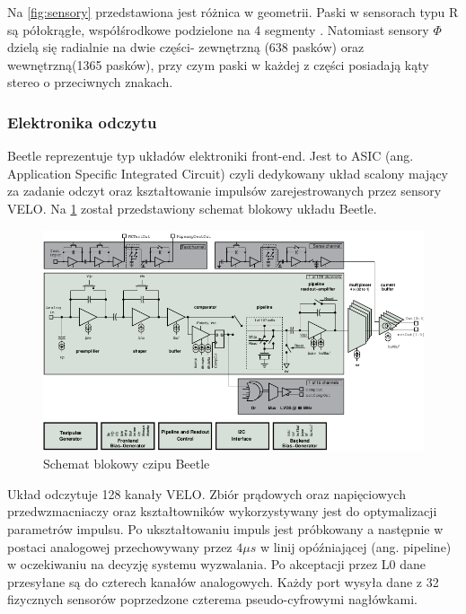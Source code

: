 Na \ref{fig:sensory} przedstawiona jest różnica w geometrii. Paski w sensorach typu R są półokrągłe, współśrodkowe podzielone na 4 segmenty . Natomiast sensory $\Phi$ dzielą się radialnie na dwie części- zewnętrzną (638 pasków) oraz wewnętrzną(1365 pasków), przy czym paski w każdej z części posiadają kąty stereo o przeciwnych znakach.
\subsubsection{Elektronika odczytu}
Beetle reprezentuje typ układów elektroniki front-end. Jest to ASIC (ang.  Application Specific Integrated Circuit) czyli dedykowany układ scalony mający za zadanie odczyt oraz kształtowanie impulsów zarejestrowanych przez sensory VELO.  Na \ref{fig:Beetle_Block} został przedstawiony schemat blokowy układu Beetle.
\begin{figure}[ht]
 \centering
 \includegraphics[scale=0.8]{rozdzial2/Beetle_block.jpeg}
 \caption{Schemat blokowy czipu Beetle\cite{Beetle}}
 \label{fig:Beetle_Block}
\end{figure}

Układ odczytuje 128 kanały VELO. Zbiór prądowych oraz napięciowych przedwzmacniaczy oraz kształtowników wykorzystywany jest do optymalizacji parametrów impulsu. 
Po ukształtowaniu impuls jest próbkowany a następnie w postaci analogowej przechowywany przez $4\mu s$ w linij opóźniającej (ang. pipeline) w oczekiwaniu na decyzję systemu wyzwalania. Po akceptacji przez L0 dane przesyłane są do czterech kanałów analogowych. Każdy port wysyła dane z 32 fizycznych sensorów poprzedzone czterema pseudo-cyfrowymi nagłówkami.
